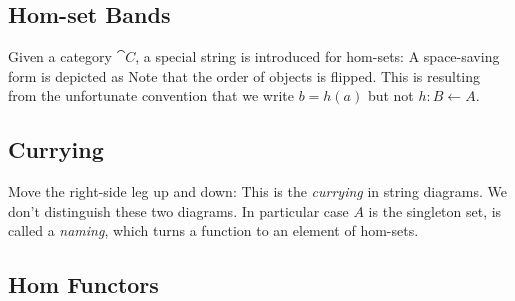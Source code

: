 \subsection{Hom-set Bands}
Given a category $\cat{C}$, a special string is introduced for hom-sets:
A space-saving form is depicted as
Note that the order of objects is flipped. %
This is resulting from the unfortunate convention that we write $b = h(a)$ but not $h : B \leftarrow A$.


\subsection{Currying}

Move the right-side leg up and down:
This is the \textit{currying} in string diagrams. %
We don't distinguish these two diagrams. In particular case $A$ is the singleton set,
is called a \textit{naming}, which turns a function to an element of hom-sets.


\subsection{Hom Functors}

